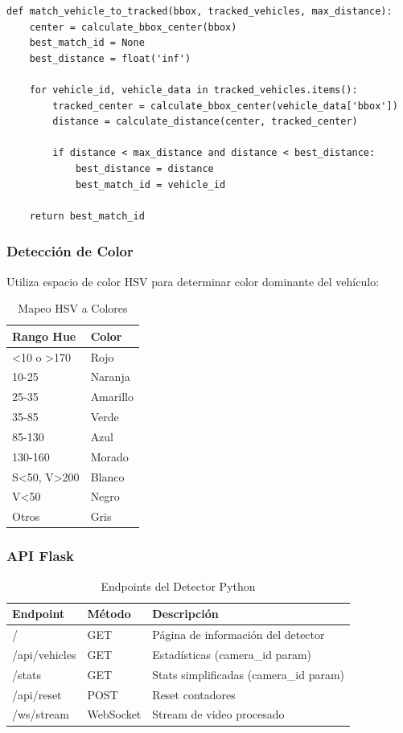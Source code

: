 \begin{lstlisting}[caption={Algoritmo de Tracking}, style=pythonstyle, label=lst:tracking]
def match_vehicle_to_tracked(bbox, tracked_vehicles, max_distance):
    center = calculate_bbox_center(bbox)
    best_match_id = None
    best_distance = float('inf')
    
    for vehicle_id, vehicle_data in tracked_vehicles.items():
        tracked_center = calculate_bbox_center(vehicle_data['bbox'])
        distance = calculate_distance(center, tracked_center)
        
        if distance < max_distance and distance < best_distance:
            best_distance = distance
            best_match_id = vehicle_id
    
    return best_match_id
\end{lstlisting}

\subsubsection{Detección de Color}

Utiliza espacio de color HSV para determinar color dominante del vehículo:

\begin{table}[H]
\centering
\begin{tabular}{|l|l|}
\hline
\textbf{Rango Hue} & \textbf{Color} \\
\hline
\textless 10 o \textgreater 170 & Rojo \\
10-25 & Naranja \\
25-35 & Amarillo \\
35-85 & Verde \\
85-130 & Azul \\
130-160 & Morado \\
S\textless50, V\textgreater200 & Blanco \\
V\textless50 & Negro \\
Otros & Gris \\
\hline
\end{tabular}
\caption{Mapeo HSV a Colores}
\end{table}

\subsubsection{API Flask}

\begin{table}[H]
\centering
\begin{tabular}{|l|l|p{5cm}|}
\hline
\textbf{Endpoint} & \textbf{Método} & \textbf{Descripción} \\
\hline
/ & GET & Página de información del detector \\
\hline
/api/vehicles & GET & Estadísticas (camera\_id param) \\
\hline
/stats & GET & Stats simplificadas (camera\_id param) \\
\hline
/api/reset & POST & Reset contadores \\
\hline
/ws/stream & WebSocket & Stream de video procesado \\
\hline
\end{tabular}
\caption{Endpoints del Detector Python}
\end{table}

